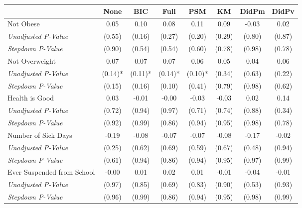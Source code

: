 \begin{tabular}{l c c c c c c c}
\toprule
 & None & BIC & Full & PSM & KM & DidPm & DidPv \\
\midrule
Not Obese & 0.05 & 0.10 & 0.08 & 0.11 & 0.09 & -0.03 & 0.02 \\
\quad \textit{Unadjusted P-Value} & (0.55) & (0.16) & (0.27) & (0.20) & (0.29) & (0.80) & (0.87) \\
\quad \textit{Stepdown P-Value} & (0.90) & (0.54) & (0.54) & (0.60) & (0.78) & (0.98) & (0.78) \\
Not Overweight & 0.07 & 0.07 & 0.07 & 0.06 & 0.05 & 0.04 & 0.06 \\
\quad \textit{Unadjusted P-Value} & (0.14)* & (0.11)* & (0.14)* & (0.10)* & (0.34) & (0.63) & (0.22) \\
\quad \textit{Stepdown P-Value} & (0.15) & (0.16) & (0.10) & (0.41) & (0.79) & (0.98) & (0.62) \\
Health is Good & 0.03 & -0.01 & -0.00 & -0.03 & -0.03 & 0.02 & 0.14 \\
\quad \textit{Unadjusted P-Value} & (0.72) & (0.94) & (0.97) & (0.71) & (0.74) & (0.88) & (0.34) \\
\quad \textit{Stepdown P-Value} & (0.92) & (0.99) & (0.86) & (0.94) & (0.95) & (0.98) & (0.78) \\
Number of Sick Days & -0.19 & -0.08 & -0.07 & -0.07 & -0.08 & -0.17 & -0.02 \\
\quad \textit{Unadjusted P-Value} & (0.25) & (0.62) & (0.69) & (0.59) & (0.67) & (0.48) & (0.94) \\
\quad \textit{Stepdown P-Value} & (0.61) & (0.94) & (0.86) & (0.94) & (0.95) & (0.97) & (0.99) \\
Ever Suspended from School & -0.00 & 0.01 & 0.02 & 0.01 & -0.01 & -0.04 & -0.01 \\
\quad \textit{Unadjusted P-Value} & (0.97) & (0.85) & (0.69) & (0.83) & (0.90) & (0.53) & (0.93) \\
\quad \textit{Stepdown P-Value} & (0.96) & (0.99) & (0.86) & (0.94) & (0.95) & (0.98) & (0.99) \\
\bottomrule
\end{tabular}
